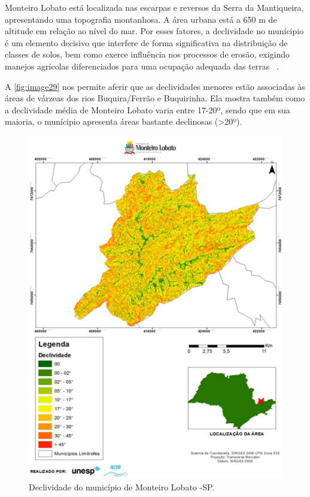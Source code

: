Monteiro Lobato está localizada nas escarpas e reversos da Serra da Mantiqueira, apresentando uma topografia montanhosa. A área urbana está a 650 m de altitude em relação ao nível do mar. Por esses fatores, a declividade no munícipio é um elemento decisivo que interfere de forma significativa na distribuição de classes de solos, bem como exerce influência nos processos de erosão, exigindo manejos agrícolas diferenciados para uma ocupação adequada das terras ~\cite{MonteiroLobato2014}.

A \autoref{fig:image29} nos permite aferir que as declividades menores estão   associadas às áreas de várzeas dos rios Buquira/Ferrão e Buquirinha. Ela mostra também como a declividade média de Monteiro Lobato varia entre 17-20º, sendo que em sua maioria, o munícipio apresenta áreas bastante declinosas (>20º).
\clearpage
\begin{figure}[h]
	\centering
	\includegraphics[width=1\linewidth]{produtos/proddois/image29}
	\caption{Declividade do município de Monteiro Lobato -SP.}
	\label{fig:image29}
\end{figure}

